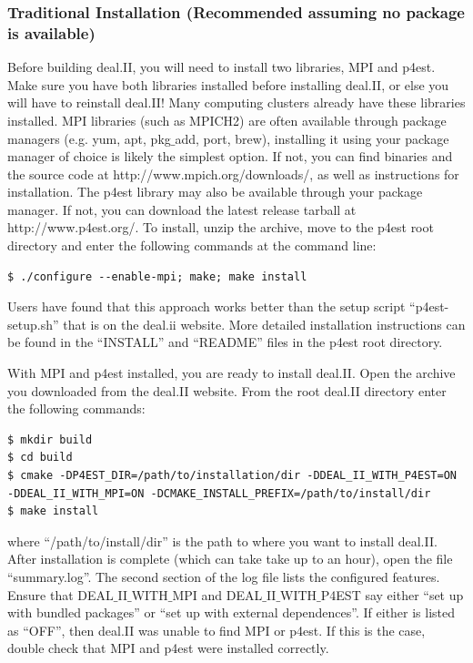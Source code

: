 \documentclass[10pt]{article} %
\begin{document}
\subsubsection{Traditional Installation (Recommended assuming no package is available)}
Before building deal.II, you will need to install two libraries, MPI and p4est. Make sure you have both libraries installed before installing deal.II, or else you will have to reinstall deal.II! Many computing clusters already have these libraries installed. MPI libraries (such as MPICH2) are often available through package managers (e.g. yum, apt, pkg$\_$add, port, brew), installing it using your package manager of choice is likely the simplest option. If not, you can find binaries and the source code at http://www.mpich.org/downloads/, as well as instructions for installation. The p4est library may also be available through your package manager. If not, you can download the latest release tarball at http://www.p4est.org/. To install, unzip the archive, move to the p4est root directory and enter the following commands at the command line:
\begin{lstlisting}
$ ./configure --enable-mpi; make; make install
\end{lstlisting}
Users have found that this approach works better than the setup script ``p4est-setup.sh'' that is on the deal.ii website. More detailed installation instructions can be found in the ``INSTALL'' and ``README'' files in the p4est root directory.

With MPI and p4est installed, you are ready to install deal.II. Open the archive you downloaded from the deal.II website. From the root deal.II directory enter the following commands:
\begin{lstlisting}
$ mkdir build
$ cd build
$ cmake -DP4EST_DIR=/path/to/installation/dir -DDEAL_II_WITH_P4EST=ON 
-DDEAL_II_WITH_MPI=ON -DCMAKE_INSTALL_PREFIX=/path/to/install/dir
$ make install
\end{lstlisting}
where ``/path/to/install/dir'' is the path to where you want to install deal.II. After installation is complete (which can take take up to an hour), open the file ``summary.log''. The second section of the log file lists the configured features. Ensure that DEAL$\_$II$\_$WITH$\_$MPI and DEAL$\_$II$\_$WITH$\_$P4EST say either ``set up with bundled packages'' or ``set up with external dependences''. If either is listed as ``OFF'', then deal.II was unable to find MPI or p4est. If this is the case, double check that MPI and p4est were installed correctly. 
\end{document}

